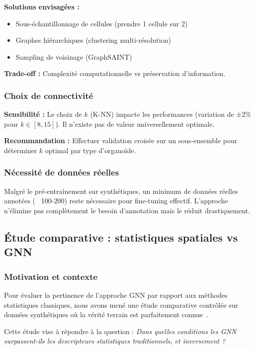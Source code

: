 \textbf{Solutions envisagées :}
\begin{itemize}
    \item Sous-échantillonnage de cellules (prendre 1 cellule sur 2)
    \item Graphes hiérarchiques (clustering multi-résolution)
    \item Sampling de voisinage (GraphSAINT)
\end{itemize}

\textbf{Trade-off :}
Complexité computationnelle vs préservation d'information.

\subsubsection{Choix de connectivité}

\textbf{Sensibilité :}
Le choix de $k$ (K-NN) impacte les performances (variation de ±2\% pour $k \in [8, 15]$). Il n'existe pas de valeur universellement optimale.

\textbf{Recommandation :}
Effectuer validation croisée sur un sous-ensemble pour déterminer $k$ optimal par type d'organoïde.

\subsubsection{Nécessité de données réelles}

Malgré le pré-entraînement sur synthétiques, un minimum de données réelles annotées (~ 100-200) reste nécessaire pour fine-tuning effectif. L'approche n'élimine pas complètement le besoin d'annotation mais le réduit drastiquement.

\subsection{Étude comparative : statistiques spatiales vs GNN}

\subsubsection{Motivation et contexte}

Pour évaluer la pertinence de l'approche GNN par rapport aux méthodes statistiques classiques, nous avons mené une étude comparative contrôlée sur données synthétiques où la vérité terrain est parfaitement connue~\cite{Martin2025GRETSI2}.

Cette étude vise à répondre à la question : \textit{Dans quelles conditions les GNN surpassent-ils les descripteurs statistiques traditionnels, et inversement ?}

